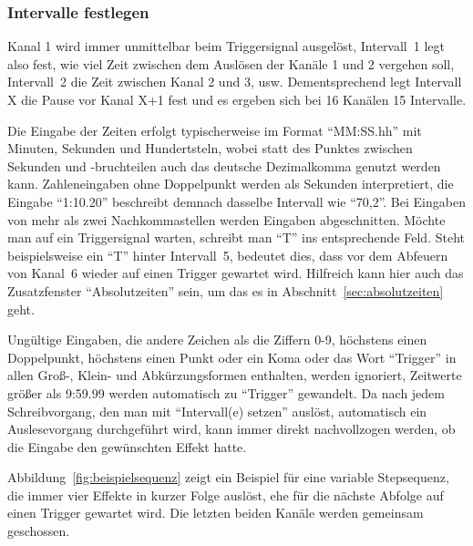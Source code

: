 \documentclass[paper=a4, open=any]{scrbook}
\begin{document}
			\subsubsection*{Intervalle festlegen}	
				
				Kanal 1 wird immer unmittelbar beim Triggersignal ausgelöst, Intervall~1 legt also fest, wie viel Zeit zwischen dem Auslösen der Kanäle 1 und 2 vergehen soll, Intervall~2 die Zeit zwischen Kanal 2 und 3, usw. Dementsprechend legt Intervall X die Pause vor Kanal X+1 fest und es ergeben sich bei 16 Kanälen 15 Intervalle.
				
				Die Eingabe der Zeiten erfolgt typischerweise im Format \enquote{MM:SS.hh} mit Minuten, Sekunden und Hundertsteln, wobei statt des Punktes zwischen Sekunden und -bruchteilen auch das deutsche Dezimalkomma genutzt werden kann. Zahleneingaben ohne Doppelpunkt werden als Sekunden interpretiert, die Eingabe \enquote{1:10.20} beschreibt demnach dasselbe Intervall wie \enquote{70,2}. Bei Eingaben von mehr als zwei Nachkommastellen werden Eingaben abgeschnitten. Möchte man auf ein Triggersignal warten, schreibt man \enquote{T} ins entsprechende Feld. Steht beispielsweise ein \enquote{T} hinter Intervall~5, bedeutet dies, dass vor dem Abfeuern von Kanal~6 wieder auf einen Trigger gewartet wird. Hilfreich kann hier auch das Zusatzfenster \enquote{Absolutzeiten} sein, um das es in Abschnitt~\ref{sec:absolutzeiten} geht.
				
				Ungültige Eingaben, die andere Zeichen als die Ziffern 0-9, höchstens einen Doppelpunkt, höchstens einen Punkt oder ein Koma oder das Wort \enquote{Trigger} in allen Groß-, Klein- und Abkürzungsformen enthalten, werden ignoriert, Zeitwerte größer als 9:59.99 werden automatisch zu \enquote{Trigger} gewandelt. Da nach jedem Schreibvorgang, den man mit \enquote{Intervall(e) setzen} auslöst, automatisch ein Auslesevorgang durchgeführt wird, kann immer direkt nachvollzogen werden, ob die Eingabe den gewünschten Effekt hatte.
				
				Abbildung~\ref{fig:beispielsequenz} zeigt ein Beispiel für eine variable Stepsequenz, die immer vier Effekte in kurzer Folge auslöst, ehe für die nächste Abfolge auf einen Trigger gewartet wird. Die letzten beiden Kanäle werden gemeinsam geschossen.
				
\end{document}

